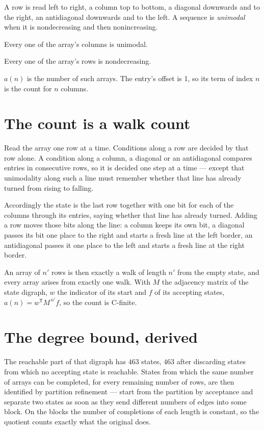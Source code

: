 \documentclass[11pt]{article}
\theoremstyle{definition}
\begin{document}
A row is read left to right, a column top to bottom, a diagonal downwards and to the right, an antidiagonal downwards and to the left. A sequence is {\itshape unimodal} when it is nondecreasing and then nonincreasing.

Every one of the array's columns is unimodal.

Every one of the array's rows is nondecreasing.

$a(n)$ is the number of such arrays. The entry's offset is 1, so its term of index $n$ is the count for $n$ columns.

\section{The count is a walk count}

Read the array one row at a time. Conditions along a row are decided by that row alone. A condition along a column, a diagonal or an antidiagonal compares entries in consecutive rows, so it is decided one step at a time --- except that unimodality along such a line must remember whether that line has already turned from rising to falling.

Accordingly the state is the last row together with one bit for each of the columns through its entries, saying whether that line has already turned. Adding a row moves those bits along the line: a column keeps its own bit, a diagonal passes its bit one place to the right and starts a fresh line at the left border, an antidiagonal passes it one place to the left and starts a fresh line at the right border.

An array of $n'$ rows is then exactly a walk of length $n'$ from the empty state, and every array arises from exactly one walk. With $M$ the adjacency matrix of the state digraph, $w$ the indicator of its start and $f$ of its accepting states, $a(n) = w^{\mathsf T}M^{\,n'}f$, so the count is C-finite.

\section{The degree bound, derived}

The reachable part of that digraph has $463$ states, $463$ after discarding states from which no accepting state is reachable. States from which the same number of arrays can be completed, for every remaining number of rows, are then identified by partition refinement --- start from the partition by acceptance and separate two states as soon as they send different numbers of edges into some block. On the blocks the number of completions of each length is constant, so the quotient counts exactly what the original does.
\end{document}

